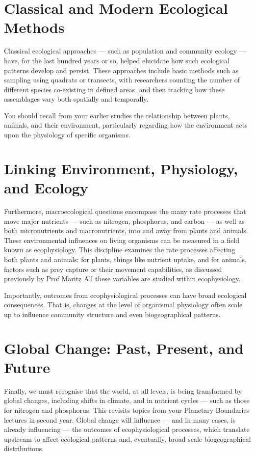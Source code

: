 \documentclass[
  10pt,
]{book}
\begin{document}
\section{Classical and Modern Ecological
Methods}\label{classical-and-modern-ecological-methods}

Classical ecological approaches --- such as population and community
ecology --- have, for the last hundred years or so, helped elucidate how
such ecological patterns develop and persist. These approaches include
basic methods such as sampling using quadrats or transects, with
researchers counting the number of different species co-existing in
defined areas, and then tracking how these assemblages vary both
spatially and temporally.

You should recall from your earlier studies the relationship between
plants, animals, and their environment, particularly regarding how the
environment acts upon the physiology of specific organisms.

\section{Linking Environment, Physiology, and
Ecology}\label{linking-environment-physiology-and-ecology}

Furthermore, macroecological questions encompass the many rate processes
that move major nutrients --- such as nitrogen, phosphorus, and carbon
--- as well as both micronutrients and macronutrients, into and away
from plants and animals. These environmental influences on living
organisms can be measured in a field known as ecophysiology. This
discipline examines the rate processes affecting both plants and
animals: for plants, things like nutrient uptake, and for animals,
factors such as prey capture or their movement capabilities, as
discussed previously by Prof Maritz All these variables are studied
within ecophysiology.

Importantly, outcomes from ecophysiological processes can have broad
ecological consequences. That is, changes at the level of organismal
physiology often scale up to influence community structure and even
biogeographical patterns.

\section{Global Change: Past, Present, and
Future}\label{global-change-past-present-and-future}

Finally, we must recognise that the world, at all levels, is being
transformed by global changes, including shifts in climate, and in
nutrient cycles --- such as those for nitrogen and phosphorus. This
revisits topics from your Planetary Boundaries lectures in second year.
Global change will influence --- and in many cases, is already
influencing --- the outcomes of ecophysiological processes, which
translate upstream to affect ecological patterns and, eventually,
broad-scale biogeographical distributions.
\end{document}
